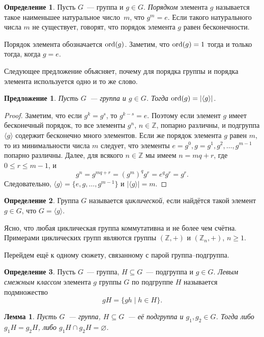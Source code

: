 \documentclass[a4paper,10pt]{amsart}
\def\ZZ{{\mathbb Z}}%
\def\ord{{\rm ord}}%
\def\ord{{\rm ord}}
\def\ord{{\rm ord}}
\newtheorem{proposition}{Предложение}
\newtheorem{lemma}{Лемма}
\theoremstyle{definition}
\newtheorem{definition}{Определение}
\theoremstyle{remark}
\begin{document}
\begin{definition}
Пусть $G$~--- группа и $g\in G$. {\it Порядком} элемента $g$
называется такое наименьшее натуральное число~$m$, что $g^m=e$. Если
такого натурального числа $m$ не существует, говорят, что порядок
элемента $g$ равен бесконечности.
\end{definition}

Порядок элемента обозначается $\ord(g)$. Заметим, что $\ord(g)=1$ тогда и только тогда, когда $g=e$.

Следующее предложение объясняет, почему для порядка группы и порядка элемента используется одно и то же слово.

\begin{proposition} \label{p1}
Пусть $G$~--- группа и $g\in G$. Тогда $\ord(g)=|\langle g\rangle|$.
\end{proposition}

\begin{proof}
Заметим, что если $g^k=g^s$, то $g^{k-s}=e$. Поэтому если элемент
$g$ имеет бесконечный порядок, то все элементы $g^n$, $n\in\ZZ$,
попарно различны, и подгруппа $\langle g\rangle$ содержит бесконечно
много элементов. Если же порядок элемента $g$ равен $m$, то из
минимальности числа $m$ следует, что элементы $e=g^0, g=g^1,
g^2,\ldots,g^{m-1}$ попарно различны. Далее, для всякого $n\in\ZZ$
мы имеем $n=mq+r$, где $0 \leqslant r \leqslant m-1$, и
$$
g^n=g^{mq+r}=(g^m)^qg^r=e^qg^r=g^r.
$$
Следовательно, $\langle g\rangle=\{e,g,\ldots, g^{m-1}\}$ и
$|\langle g\rangle|=m$.
\end{proof}

\begin{definition}
Группа $G$ называется {\it циклической}, если найдётся такой элемент
$g\in G$, что $G=\langle g\rangle$.
\end{definition}

Ясно, что любая циклическая группа коммутативна и не более чем
счётна. Примерами циклических групп являются группы $(\ZZ,+)$ и
$(\ZZ_n,+)$, $n \ge 1$.

Перейдем ещё к одному сюжету, связанному с парой группа--подгруппа.

\begin{definition}
Пусть $G$~--- группа, $H\subseteq G$~--- подгруппа и $g\in G$. {\it
Левым смежным классом} элемента $g$ группы $G$ по подгруппе $H$
называется подмножество
$$
gH=\{gh \mid h\in H\}.
$$
\end{definition}

\begin{lemma} \label{l1}
Пусть $G$~--- группа, $H\subseteq G$~--- её подгруппа и $g_1,g_2\in
G$. Тогда либо $g_1H=g_2H$, либо $g_1H\cap g_2H=\varnothing$.
\end{lemma}
\end{document}
